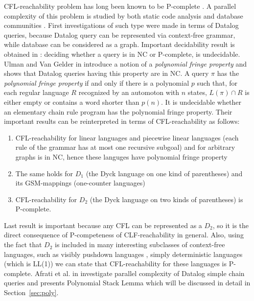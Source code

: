 \documentclass[smallextended]{svjour3}       %
\begin{document}
CFL-reachability problem has long been known to be P-complete \cite{PCompl}. A parallel complexity of this problem is studied by both static code analysis \cite*{RepSeq, RepsBasic} and database communities \cite*{ChainQ, Ullman, Yannakakis}. First investigations of such type were made in terms of Datalog queries, because Datalog query can be represented via context-free grammar, while database can be considered as a graph. Important decidability result is obtained in \cite{Vardi}: deciding whether a query is in NC or P-complete, is undecidable. Ulman and Van Gelder in \cite{Ullman} introduce a notion of a  \textit{polynomial fringe property} and shows that Datalog queries having this property are in NC. A query $\pi$ has the \textit{polynomial fringe property} if and only if there is a polynomial $p$ such that, for each regular language $R$ recognized by an automoton with $n$ states, $L(\pi) \cap R$ is either empty or contains a word shorter than $p(n)$. It is undecidable whether an elementary chain rule program has the polynomial fringe property. Their important results can be reinterpreted in terms of CFL-reachability as follows: 
\begin{enumerate}
\item CFL-reachability for linear languages and piecewise linear languages (each rule of the grammar has at most one recursive subgoal) and for arbitrary graphs is in NC, hence these languges have polynomial fringe property
\item The same holds for $D_1$ (the Dyck language on one kind of parentheses) and its GSM-mappings (one-counter languages)
\item CFL-reachability for $D_2$ (the Dyck language on two kinds of parentheses) is P-complete.
\end{enumerate}
Last result is important because any CFL can be represented as a $D_2$, so it is the direct consequence of P-competeness of CLF-reachability in general. Also, using the fact that $D_2$ is included in many interesting subclasses of context-free languages, such as visibly pushdown languages \cite{Okhotin2014ComplexityOI}, simply deterministic languages (which is LL(1)) we can state that CFL-reachability for these languages is P-complete. Afrati et al. in \cite{ChainQ} investigate parallel complexity of Datalog simple chain queries and presents Polynomial Stack Lemma which will be discussed in detail in Section~\ref{sec:poly}. 
\end{document}
